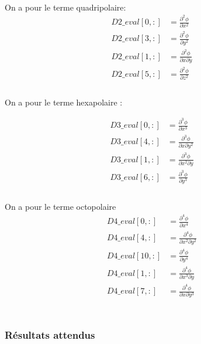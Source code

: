 \documentclass{report}
\begin{document}
\
\\
On a pour le terme quadripolaire:
\begin{align*}
D2\_eval[0, :] &= \frac{\partial^{2} \phi}{\partial x^{2}} \\
D2\_eval[3, :] &= \frac{\partial^{2} \phi}{\partial y^{2}} \\
D2\_eval[1, :] &= \frac{\partial^{2} \phi}{\partial x \partial y}\\
D2\_eval[5, :] &= \frac{\partial^{2} \phi}{\partial z^2}\\
\end{align*}
\
\\
On a pour le terme hexapolaire  : 

\begin{align*}
D3\_eval[0, :] &= \frac{\partial^{3} \phi}{\partial x^{3}} \\
D3\_eval[4, :] &= \frac{\partial^{3} \phi}{\partial x\partial y^{2}} \\
D3\_eval[1, :] &= \frac{\partial^{3} \phi}{\partial x^{2} \partial y}\\
D3\_eval[6, :] &= \frac{\partial^{3} \phi}{\partial y^{3}} \\
\end{align*}
\
\\
On a pour le terme octopolaire 
\begin{align*}
D4\_eval[0, :] &= \frac{\partial^{4} \phi}{\partial x^{4}} \\
D4\_eval[4, :] &= \frac{\partial^{4} \phi}{\partial x^{2}\partial y^{2}} \\
D4\_eval[10, :] &= \frac{\partial^{4} \phi}{\partial y^{4}}\\
D4\_eval[1, :] &= \frac{\partial^{4} \phi}{\partial x^{3}\partial y }\\
D4\_eval[7, :] &= \frac{\partial^{4} \phi}{\partial x\partial y^{3}}\\
\end{align*}
\
\\
\subsubsection{Résultats attendus}
\
\\
\end{document}

